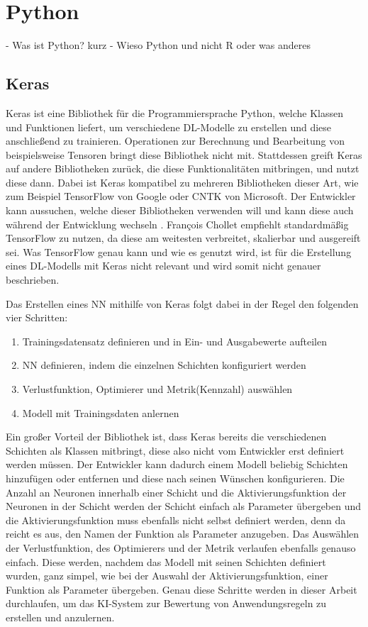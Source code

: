 \section{Python}
\label{chap:Python}
- Was ist Python? kurz
- Wieso Python und nicht R oder was anderes


\subsection{Keras}
Keras ist eine Bibliothek für die Programmiersprache Python, welche Klassen und Funktionen liefert, um verschiedene \ac{DL}-Modelle zu erstellen
und diese anschließend zu trainieren. Operationen zur Berechnung und Bearbeitung von beispielsweise Tensoren bringt diese Bibliothek nicht mit.
Stattdessen greift Keras auf andere Bibliotheken zurück, die diese Funktionalitäten mitbringen, und nutzt diese dann. Dabei ist Keras kompatibel zu mehreren
Bibliotheken dieser Art, wie zum Beispiel TensorFlow von Google oder CNTK von Microsoft. Der Entwickler kann aussuchen, welche dieser Bibliotheken
verwenden will und kann diese auch während der Entwicklung wechseln \cite[vgl. S.89ff.]{DL_PY}. François Chollet empfiehlt standardmäßig TensorFlow zu nutzen, da diese 
\glqq am weitesten verbreitet, skalierbar und ausgereift\grqq{}\cite[S.91]{DL_PY} sei. Was TensorFlow genau kann und wie es genutzt wird, ist für die Erstellung eines
\ac{DL}-Modells mit Keras nicht relevant und wird somit nicht genauer beschrieben.

Das Erstellen eines \ac{NN} mithilfe von Keras folgt dabei in der Regel den folgenden vier Schritten:
\begin{enumerate}
    \item Trainingsdatensatz definieren und in Ein- und Ausgabewerte aufteilen \cite[vgl. S.92]{DL_PY}
    \item \ac{NN} definieren, indem die einzelnen Schichten konfiguriert werden \cite[vgl. S.92]{DL_PY}
    \item Verlustfunktion, Optimierer und Metrik(Kennzahl) auswählen \cite[vgl. S.92]{DL_PY}
    \item Modell mit Trainingsdaten anlernen \cite[vgl. S.92]{DL_PY}
\end{enumerate}
Ein großer Vorteil der Bibliothek ist, dass Keras bereits die verschiedenen Schichten als Klassen mitbringt, diese also nicht vom Entwickler erst definiert werden müssen.
Der Entwickler kann dadurch einem Modell beliebig Schichten hinzufügen oder entfernen und diese nach seinen Wünschen konfigurieren. 
Die Anzahl an Neuronen innerhalb einer Schicht und die Aktivierungsfunktion der Neuronen in der Schicht werden der Schicht einfach als Parameter übergeben 
und die Aktivierungsfunktion muss ebenfalls nicht selbst definiert werden, denn da reicht es aus, den Namen der Funktion als Parameter anzugeben.
Das Auswählen der Verlustfunktion, des Optimierers und der Metrik verlaufen ebenfalls genauso einfach. Diese werden, nachdem das Modell mit seinen Schichten 
definiert wurden, ganz simpel, wie bei der Auswahl der Aktivierungsfunktion, einer Funktion als Parameter übergeben.
Genau diese Schritte werden in dieser Arbeit durchlaufen, um das \ac{KI}-System zur Bewertung von Anwendungsregeln zu erstellen und anzulernen.

